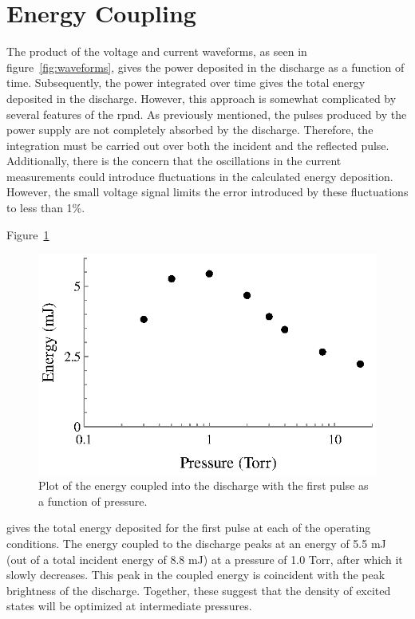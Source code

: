 \section{Energy Coupling}

The product of the voltage and current waveforms, as seen in
figure~\ref{fig:waveforms}, gives the power deposited in the discharge as a
function of time. Subsequently, the power integrated over time gives the total
energy deposited in the discharge. However, this approach is somewhat
complicated by several features of the \acs{rpnd}. As previously mentioned, the
pulses produced by the power supply are not completely absorbed by the
discharge. Therefore, the integration must be carried out over both the incident
and the reflected pulse. Additionally, there is the concern that the
oscillations in the current measurements could introduce fluctuations in the
calculated energy deposition. However, the small voltage signal limits the error
introduced by these fluctuations to less than 1\%.

Figure~\ref{fig:energies}
\begin{figure}
  \centering
  \includegraphics{./chapters/experiment/figures/energies.eps}
  \caption{Plot of the energy coupled into the discharge with the first pulse as
  a function of pressure.}
  \label{fig:energies}
\end{figure}
gives the total energy deposited for the first pulse at each of the operating
conditions. The energy coupled to the discharge peaks at an energy of 5.5 mJ
(out of a total incident energy of 8.8 mJ) at a pressure of 1.0 Torr, after
which it slowly decreases. This peak in the coupled energy is coincident with
the peak brightness of the discharge. Together, these suggest that the density
of excited states will be optimized at intermediate pressures.

